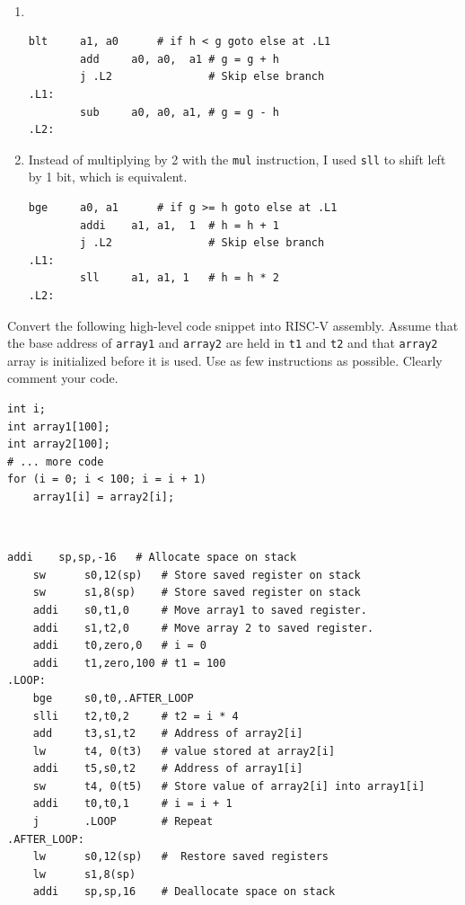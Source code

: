 \documentclass[12pt]{article}
\newenvironment{ex}[2][Exercise]{\begin{trivlist}
		\item[\hskip \labelsep {\bfseries #1}\hskip \labelsep {\bfseries #2.}]}{\end{trivlist}}
\newenvironment{sol}[1][Solution]{\begin{trivlist}
		\item[\hskip \labelsep {\bfseries #1:}]}{\end{trivlist}}
\begin{document}
\begin{sol}
	\
	\begin{enumerate}[label=(\alph*)]
		\item
		\
		\begin{lstlisting}[language={}]
		blt		a1, a0		# if h < g goto else at .L1
		add		a0, a0,  a1	# g = g + h
		j .L2				# Skip else branch
.L1: 
		sub		a0, a0,	a1,	# g = g - h
.L2:
	\end{lstlisting}
		\item Instead of multiplying by 2 with the \texttt{mul} instruction, I used \texttt{sll} to shift left by
		1 bit, which is equivalent.
		\begin{lstlisting}[language={}]
		bge		a0, a1		# if g >= h goto else at .L1
		addi	a1, a1,  1	# h = h + 1
		j .L2				# Skip else branch
.L1: 
		sll		a1, a1,	1	# h = h * 2
.L2:
		\end{lstlisting}
	\end{enumerate}
\end{sol}

\begin{ex}{6.11}
	Convert the following high-level code snippet into RISC-V assembly. Assume
	that the base address of \texttt{array1} and \texttt{array2} are held in
	\texttt{t1} and \texttt{t2} and that \texttt{array2} array is initialized
	before it is used. Use as few instructions as possible. Clearly comment
	your code.
	\begin{lstlisting}
int i;
int array1[100];
int array2[100];
# ... more code
for (i = 0; i < 100; i = i + 1)
	array1[i] = array2[i];

	\end{lstlisting}
\end{ex}

\begin{sol}
	\
	\begin{lstlisting}[language={}]
	addi	sp,sp,-16	# Allocate space on stack
	sw		s0,12(sp)	# Store saved register on stack
	sw		s1,8(sp)	# Store saved register on stack
	addi	s0,t1,0		# Move array1 to saved register.
	addi	s1,t2,0		# Move array 2 to saved register.
	addi	t0,zero,0	# i = 0
	addi	t1,zero,100	# t1 = 100
.LOOP:
	bge		s0,t0,.AFTER_LOOP
	slli	t2,t0,2		# t2 = i * 4
	add		t3,s1,t2	# Address of array2[i]
	lw		t4, 0(t3)	# value stored at array2[i]
	addi	t5,s0,t2	# Address of array1[i]
	sw		t4, 0(t5)	# Store value of array2[i] into array1[i]
	addi	t0,t0,1		# i = i + 1
	j 		.LOOP		# Repeat
.AFTER_LOOP:
	lw		s0,12(sp)	#  Restore saved registers
	lw		s1,8(sp)
	addi	sp,sp,16	# Deallocate space on stack
	\end{lstlisting}
\end{sol}
\end{document}
